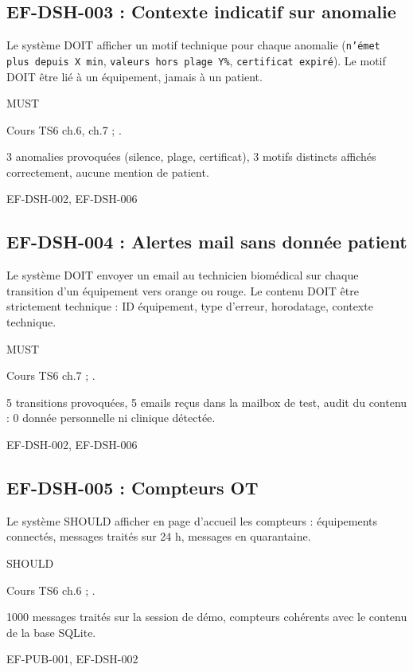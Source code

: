 \subsection*{EF-DSH-003 : Contexte indicatif sur anomalie}
\begin{description}[leftmargin=2.5cm, style=nextline]
  \item[Énoncé] Le système DOIT afficher un motif technique pour chaque anomalie (\texttt{n'émet plus depuis X min}, \texttt{valeurs hors plage Y\%}, \texttt{certificat expiré}). Le motif DOIT être lié à un équipement, jamais à un patient.
  \item[Priorité] MUST
  \item[Source] Cours TS6 ch.6, ch.7 ; \cite{ihe_pcd_tf}.
  \item[Recette] 3 anomalies provoquées (silence, plage, certificat), 3 motifs distincts affichés correctement, aucune mention de patient.
  \item[Lié à] EF-DSH-002, EF-DSH-006
\end{description}

\subsection*{EF-DSH-004 : Alertes mail sans donnée patient}
\begin{description}[leftmargin=2.5cm, style=nextline]
  \item[Énoncé] Le système DOIT envoyer un email au technicien biomédical sur chaque transition d'un équipement vers orange ou rouge. Le contenu DOIT être strictement technique : ID équipement, type d'erreur, horodatage, contexte technique.
  \item[Priorité] MUST
  \item[Source] Cours TS6 ch.7 ; \cite{ihe_pcd_tf}.
  \item[Recette] 5 transitions provoquées, 5 emails reçus dans la mailbox de test, audit du contenu : 0 donnée personnelle ni clinique détectée.
  \item[Lié à] EF-DSH-002, EF-DSH-006
\end{description}

\subsection*{EF-DSH-005 : Compteurs OT}
\begin{description}[leftmargin=2.5cm, style=nextline]
  \item[Énoncé] Le système SHOULD afficher en page d'accueil les compteurs : équipements connectés, messages traités sur 24 h, messages en quarantaine.
  \item[Priorité] SHOULD
  \item[Source] Cours TS6 ch.6 ; \cite{ihe_pcd_tf}.
  \item[Recette] 1000 messages traités sur la session de démo, compteurs cohérents avec le contenu de la base SQLite.
  \item[Lié à] EF-PUB-001, EF-DSH-002
\end{description}

